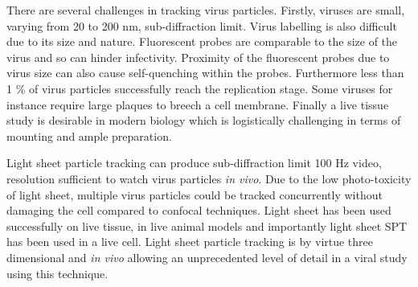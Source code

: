There are several challenges in tracking virus particles.
Firstly, viruses are small, varying from 20 to 200 nm, sub-diffraction limit. %
Virus labelling is also difficult due to its size and nature.
Fluorescent probes are comparable to the size of the virus and so can hinder infectivity.
Proximity of the fluorescent probes due to virus size can also cause self-quenching within the probes\cite{Seisenberger2001}.
Furthermore less than 1 \% of virus particles successfully reach the replication stage.
Some viruses for instance require large plaques to breech a cell membrane.
Finally a live tissue study is desirable in modern biology\cite{Brandenburg2007} which is logistically challenging in terms of mounting and ample preparation.

Light sheet particle tracking can produce sub-diffraction limit 100 Hz video, resolution sufficient to watch virus particles \textit{in vivo}.
Due to the low photo-toxicity of light sheet, multiple virus particles could be tracked concurrently without damaging the cell compared to confocal techniques.
Light sheet has been used successfully on live tissue, in live animal models\cite{Keller2008} and importantly light sheet SPT has been used in a live cell\cite{Spille2013}.
Light sheet particle tracking is by virtue three dimensional and \textit{in vivo} allowing an unprecedented level of detail in a viral study using this technique\cite{Hoffman2005}.
